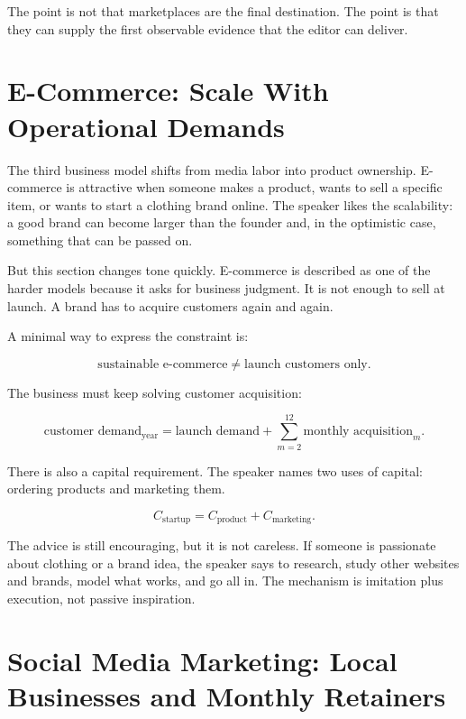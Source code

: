 The point is not that marketplaces are the final destination. The point is that they can supply the first observable evidence that the editor can deliver.

\section{E-Commerce: Scale With Operational Demands}

The third business model shifts from media labor into product ownership. E-commerce is attractive when someone makes a product, wants to sell a specific item, or wants to start a clothing brand online. The speaker likes the scalability: a good brand can become larger than the founder and, in the optimistic case, something that can be passed on.

But this section changes tone quickly. E-commerce is described as one of the harder models because it asks for business judgment. It is not enough to sell at launch. A brand has to acquire customers again and again.

A minimal way to express the constraint is:

\begin{equation}
\text{sustainable e-commerce}
\neq
\text{launch customers only}.
\end{equation}

The business must keep solving customer acquisition:

\begin{equation}
\text{customer demand}_{\mathrm{year}}
=
\text{launch demand}
+
\sum_{m=2}^{12}\text{monthly acquisition}_{m}.
\end{equation}

There is also a capital requirement. The speaker names two uses of capital: ordering products and marketing them.

\begin{equation}
C_{\mathrm{startup}}
=
C_{\mathrm{product}}
+
C_{\mathrm{marketing}}.
\end{equation}

The advice is still encouraging, but it is not careless. If someone is passionate about clothing or a brand idea, the speaker says to research, study other websites and brands, model what works, and go all in. The mechanism is imitation plus execution, not passive inspiration.

\section{Social Media Marketing: Local Businesses and Monthly Retainers}

